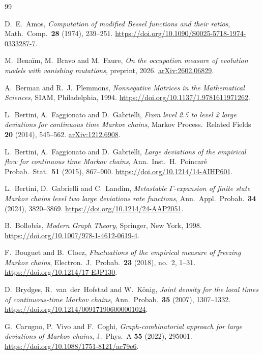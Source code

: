 \begin{thebibliography}{99}

D.~E.~Amos, \emph{Computation of modified Bessel functions and their ratios},
Math.~Comp.~\textbf{28} (1974), 239--251.
\url{https://doi.org/10.1090/S0025-5718-1974-0333287-7}.

M.~Bena\"im, M.~Bravo and M.~Faure, \emph{On the occupation measure of evolution
models with vanishing mutations}, preprint, 2026.
\href{https://arxiv.org/abs/2602.06829}{arXiv:2602.06829}.

A.~Berman and R.~J.~Plemmons, \emph{Nonnegative Matrices in the
Mathematical Sciences}, SIAM, Philadelphia, 1994.
\url{https://doi.org/10.1137/1.9781611971262}.

L.~Bertini, A.~Faggionato and D.~Gabrielli, \emph{From level 2.5 to level 2
large deviations for continuous time Markov chains}, Markov Process.~Related
Fields \textbf{20} (2014), 545--562.
\href{https://arxiv.org/abs/1212.6908}{arXiv:1212.6908}.

L.~Bertini, A.~Faggionato and D.~Gabrielli, \emph{Large deviations of the
empirical flow for continuous time Markov chains}, Ann.~Inst.~H.~Poincar\'e
Probab.~Stat.~\textbf{51} (2015), 867--900.
\url{https://doi.org/10.1214/14-AIHP601}.

L.~Bertini, D.~Gabrielli and C.~Landim, \emph{Metastable $\Gamma$-expansion
of finite state Markov chains level two large deviations rate functions},
Ann.~Appl.~Probab.~\textbf{34} (2024), 3820--3869.
\url{https://doi.org/10.1214/24-AAP2051}.

B.~Bollob\'as, \emph{Modern Graph Theory}, Springer, New York, 1998.
\url{https://doi.org/10.1007/978-1-4612-0619-4}.

F.~Bouguet and B.~Cloez, \emph{Fluctuations of the empirical measure of freezing
Markov chains}, Electron.~J.~Probab.~\textbf{23} (2018), no.~2, 1--31.
\url{https://doi.org/10.1214/17-EJP130}.

D.~Brydges, R.~van~der~Hofstad and W.~K\"onig, \emph{Joint density for the
local times of continuous-time Markov chains}, Ann.~Probab.~\textbf{35}
(2007), 1307--1332. \url{https://doi.org/10.1214/009171906000001024}.

G.~Carugno, P.~Vivo and F.~Coghi, \emph{Graph-combinatorial approach for
large deviations of Markov chains}, J.~Phys.~A \textbf{55} (2022), 295001.
\url{https://doi.org/10.1088/1751-8121/ac79e6}.


\end{thebibliography}
